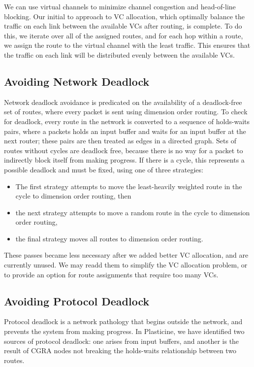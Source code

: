 We can use virtual channels to minimize channel congestion and head-of-line blocking. Our initial to approach to VC allocation, which optimally balance the traffic on each link between the available VCs after routing, is complete. To do this, we iterate over all of the assigned routes, and for each hop within a route, we assign the route to the virtual channel with the least traffic. This ensures that the traffic on each link will be distributed evenly between the available VCs.

\subsection{Avoiding Network Deadlock}
Network deadlock avoidance is predicated on the availability of a deadlock-free set of routes, where every packet is sent using dimension order routing.
To check for deadlock, every route in the network is converted to a sequence of holds-waits pairs, where a packets holds an input buffer and waits for an input buffer at the next router; these pairs are then treated as edges in a directed graph.
Sets of routes without cycles are deadlock free, because there is no way for a packet to indirectly block itself from making progress.
If there is a cycle, this represents a possible deadlock and must be fixed, using one of three strategies:
\begin{itemize}
    \item The first strategy attempts to move the least-heavily weighted route in the cycle to dimension order routing, then
    \item the next strategy attempts to move a random route in the cycle to dimension order routing,
    \item the final strategy moves all routes to dimension order routing.
\end{itemize}
These passes became less necessary after we added better VC allocation, and are currently unused. We may readd them to simplify the VC allocation problem, or to provide an option for route assignments that require too many VCs.

\subsection{Avoiding Protocol Deadlock}
Protocol deadlock is a network pathology that begins outside the network, and prevents the system from making progress.
In Plasticine, we have identified two sources of protocol deadlock: one arises from input buffers, and another is the result of CGRA nodes not breaking the holds-waits relationship between two routes.
